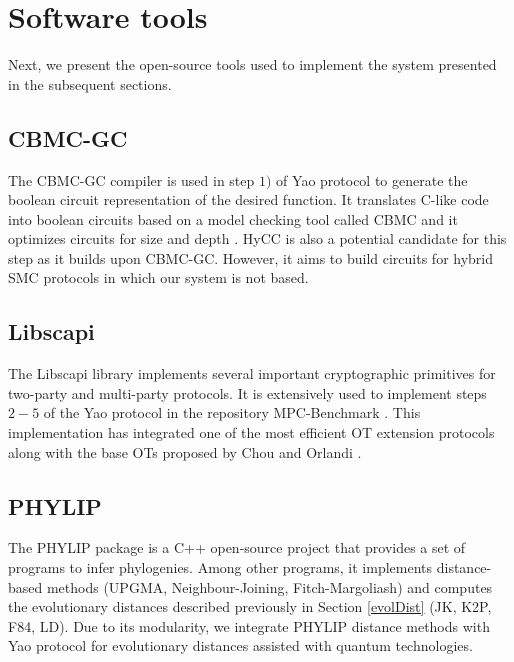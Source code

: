 \section{Software tools} \label{softTools}


Next, we present the open-source tools used to implement the system presented in the subsequent sections.

\subsection{CBMC-GC}

The CBMC-GC compiler \cite{F14} is used in step $1)$ of Yao protocol to generate the boolean circuit representation of the desired function. It translates C-like code into boolean circuits based on a model checking tool called CBMC and it optimizes circuits for size and depth \cite{Bscher2017, Buescher2016}. HyCC \cite{Bscher2018} is also a potential candidate for this step as it builds upon CBMC-GC. However, it aims to build circuits for hybrid SMC protocols in which our system is not based.

\subsection{Libscapi}

The Libscapi library \cite{libscapi} implements several important cryptographic primitives for two-party and multi-party protocols. It is extensively used to implement steps $2-5$ of the Yao protocol in the repository MPC-Benchmark \cite{mpc_benchmark}. This implementation has integrated one of the most efficient OT extension protocols \cite{K15} along with the base OTs proposed by Chou and Orlandi \cite{C15}.

\subsection{PHYLIP}

The PHYLIP package \cite{F89} is a C++ open-source project that provides a set of programs to infer phylogenies. Among other programs, it implements distance-based methods (UPGMA, Neighbour-Joining, Fitch-Margoliash) and computes the evolutionary distances described previously in Section \ref{evolDist} (JK, K2P, F84, LD). Due to its modularity, we integrate PHYLIP distance methods with Yao protocol for evolutionary distances assisted with quantum technologies.




